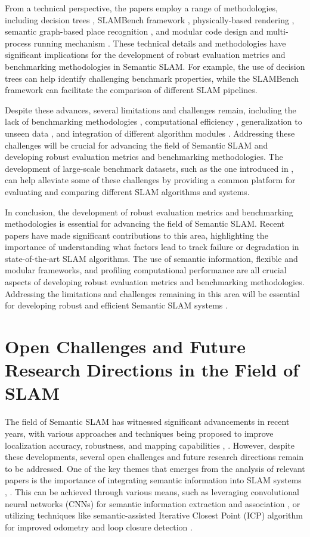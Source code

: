 \documentclass[conference]{IEEEtran}
\begin{document}
From a technical perspective, the papers employ a range of methodologies, including decision trees \cite{b2}, SLAMBench framework \cite{b3}, physically-based rendering \cite{b10}, semantic graph-based place recognition \cite{b11}, and modular code design and multi-process running mechanism \cite{b6}. These technical details and methodologies have significant implications for the development of robust evaluation metrics and benchmarking methodologies in Semantic SLAM. For example, the use of decision trees can help identify challenging benchmark properties, while the SLAMBench framework can facilitate the comparison of different SLAM pipelines.

Despite these advances, several limitations and challenges remain, including the lack of benchmarking methodologies \cite{b1}, computational efficiency \cite{b7}, generalization to unseen data \cite{b12}, and integration of different algorithm modules \cite{b6}. Addressing these challenges will be crucial for advancing the field of Semantic SLAM and developing robust evaluation metrics and benchmarking methodologies. The development of large-scale benchmark datasets, such as the one introduced in \cite{b4}, can help alleviate some of these challenges by providing a common platform for evaluating and comparing different SLAM algorithms and systems.

In conclusion, the development of robust evaluation metrics and benchmarking methodologies is essential for advancing the field of Semantic SLAM. Recent papers have made significant contributions to this area, highlighting the importance of understanding what factors lead to track failure or degradation in state-of-the-art SLAM algorithms. The use of semantic information, flexible and modular frameworks, and profiling computational performance are all crucial aspects of developing robust evaluation metrics and benchmarking methodologies. Addressing the limitations and challenges remaining in this area will be essential for developing robust and efficient Semantic SLAM systems \cite{b13}.

\section{Open Challenges and Future Research Directions in the Field of SLAM}
The field of Semantic SLAM has witnessed significant advancements in recent years, with various approaches and techniques being proposed to improve localization accuracy, robustness, and mapping capabilities \cite{b1}, \cite{b2}. However, despite these developments, several open challenges and future research directions remain to be addressed. One of the key themes that emerges from the analysis of relevant papers is the importance of integrating semantic information into SLAM systems \cite{b3}, \cite{b4}. This can be achieved through various means, such as leveraging convolutional neural networks (CNNs) for semantic information extraction and association \cite{b5}, or utilizing techniques like semantic-assisted Iterative Closest Point (ICP) algorithm for improved odometry and loop closure detection \cite{b1}.
\end{document}
